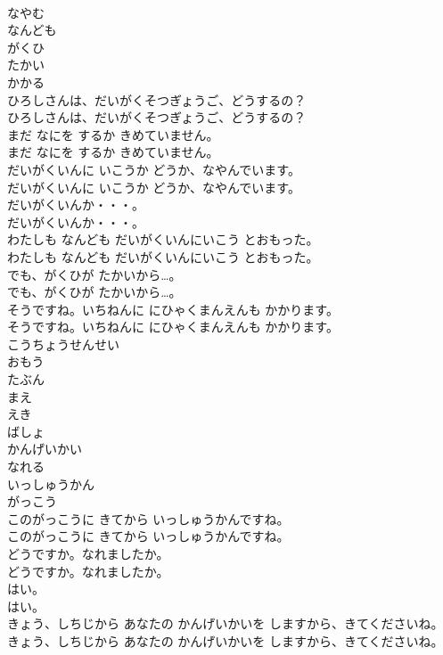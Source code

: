 \documentclass[8pt]{extreport}
\begin{document}
\begin{CJK}{UTF8}{min}
\\	なやむ
\\	なんども
\\	がくひ
\\	たかい
\\	かかる
\\	ひろしさんは、だいがくそつぎょうご、どうするの？
\\	ひろしさんは、だいがくそつぎょうご、どうするの？
\\	まだ なにを するか きめていません。
\\	まだ なにを するか きめていません。
\\	だいがくいんに いこうか どうか、なやんでいます。
\\	だいがくいんに いこうか どうか、なやんでいます。
\\	だいがくいんか・・・。
\\	だいがくいんか・・・。
\\	わたしも なんども だいがくいんにいこう とおもった。
\\	わたしも なんども だいがくいんにいこう とおもった。
\\	でも、がくひが たかいから…。
\\	でも、がくひが たかいから…。
\\	そうですね。いちねんに にひゃくまんえんも かかります。
\\	そうですね。いちねんに にひゃくまんえんも かかります。
\\	こうちょうせんせい
\\	おもう
\\	たぶん
\\	まえ
\\	えき
\\	ばしょ
\\	かんげいかい
\\	なれる
\\	いっしゅうかん
\\	がっこう
\\	このがっこうに きてから いっしゅうかんですね。
\\	このがっこうに きてから いっしゅうかんですね。
\\	どうですか。なれましたか。
\\	どうですか。なれましたか。
\\	はい。
\\	はい。
\\	きょう、しちじから あなたの かんげいかいを しますから、きてくださいね。
\\	きょう、しちじから あなたの かんげいかいを しますから、きてくださいね。

\end{CJK}
\end{document}
